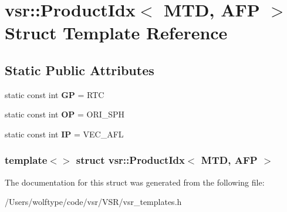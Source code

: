 \hypertarget{structvsr_1_1_product_idx_3_01_m_t_d_00_01_a_f_p_01_4}{\section{vsr\-:\-:Product\-Idx$<$ M\-T\-D, A\-F\-P $>$ Struct Template Reference}
\label{structvsr_1_1_product_idx_3_01_m_t_d_00_01_a_f_p_01_4}
}
\subsection*{Static Public Attributes}
\begin{DoxyCompactItemize}
\item 
\hypertarget{structvsr_1_1_product_idx_3_01_m_t_d_00_01_a_f_p_01_4_a1063d969c997372dd2d932955312308d}{static const int {\bfseries G\-P} = R\-T\-C}\label{structvsr_1_1_product_idx_3_01_m_t_d_00_01_a_f_p_01_4_a1063d969c997372dd2d932955312308d}

\item 
\hypertarget{structvsr_1_1_product_idx_3_01_m_t_d_00_01_a_f_p_01_4_afec954953d29bc2ca75bf3fe4c652180}{static const int {\bfseries O\-P} = O\-R\-I\-\_\-\-S\-P\-H}\label{structvsr_1_1_product_idx_3_01_m_t_d_00_01_a_f_p_01_4_afec954953d29bc2ca75bf3fe4c652180}

\item 
\hypertarget{structvsr_1_1_product_idx_3_01_m_t_d_00_01_a_f_p_01_4_a75e1cded38e5acdfd26438741e6c2d3e}{static const int {\bfseries I\-P} = V\-E\-C\-\_\-\-A\-F\-L}\label{structvsr_1_1_product_idx_3_01_m_t_d_00_01_a_f_p_01_4_a75e1cded38e5acdfd26438741e6c2d3e}

\end{DoxyCompactItemize}
\subsubsection*{template$<$$>$ struct vsr\-::\-Product\-Idx$<$ M\-T\-D, A\-F\-P $>$}



The documentation for this struct was generated from the following file\-:\begin{DoxyCompactItemize}
\item 
/\-Users/wolftype/code/vsr/\-V\-S\-R/vsr\-\_\-templates.\-h\end{DoxyCompactItemize}
